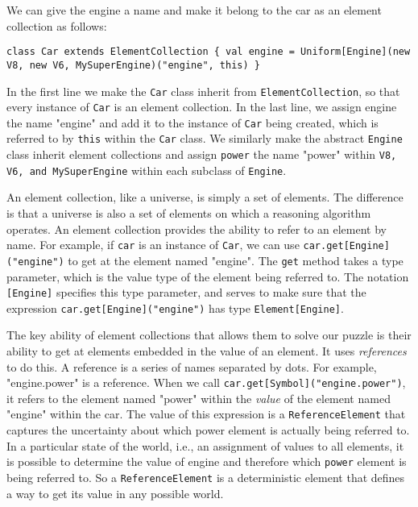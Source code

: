 We can give the engine a name and make it belong to the car as an element collection as follows:

\begin{flushleft}
\texttt{class Car extends ElementCollection \{
\newline \tab val engine = Uniform[Engine](new V8, new V6, MySuperEngine)("engine", this)
\newline \}
}
\end{flushleft}

In the first line we make the \texttt{Car} class inherit from \texttt{ElementCollect\-ion}, so that every instance of \texttt{Car} is an element collection. In the last line, we assign engine the name "engine" and add it to the instance of \texttt{Car} being created, which is referred to by \texttt{this} within the \texttt{Car} class. We similarly make the abstract \texttt{Engine} class inherit  element collections and assign \texttt{power} the name "power" within \texttt{V8, V6, and MySuperEngine} within each subclass of  \texttt{Engine}.

An element collection, like a universe, is simply a set of elements. The difference is that a universe is also a set of elements on which a reasoning algorithm operates. An element collection provides the ability to refer to an element by name. For example, if \texttt{car} is an instance of \texttt{Car}, we can use \texttt{car.get[Engine]("engine")} to get at the element named "engine". The \texttt{get} method takes a type parameter, which is the value type of the element being referred to. The notation \texttt{[Engine]} specifies this type parameter, and serves to make sure that the expression \texttt{car.get[Engine]("engine")} has type \texttt{Element[Engine]}.

The key ability of element collections that allows them to solve our puzzle is their ability to get at elements embedded in the value of an element.  It uses \emph{references} to do this. A reference is a series of names separated by dots. For example, "engine.power" is a reference. When we call \texttt{car.get[Symbol]("engine.power")}, it refers to the element named "power" within the \emph{value} of the element named "engine" within the car. The value of this expression is a \texttt{ReferenceElement} that captures the uncertainty about which power element is actually being referred to. In a particular state of the world, i.e., an assignment of values to all elements, it is possible to determine the value of engine and therefore which \texttt{power} element is being referred to. So a \texttt{ReferenceElement} is a deterministic element that defines a way to get its value in any possible world.

